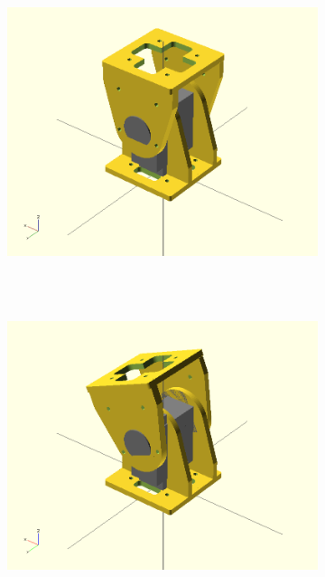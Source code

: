 \begin{figure}[h]
\begin{subfigure}[b]{0.18\textwidth}
        \end{subfigure}
        ~
        \begin{subfigure}[b]{0.18\textwidth}
         	   \centering
                \includegraphics[width=\textwidth]{images/Gait_osc_offset_90.png}
                ~
                \label{fig:Gait_osc_offset_90}
        \end{subfigure}
        ~
        \begin{subfigure}[b]{0.18\textwidth}
         	   \centering
                \includegraphics[width=\textwidth]{images/Gait_osc_offset_67_5.png}
                ~
                \label{fig:Gait_osc_offset_67_5-2}

\end{subfigure}
\end{figure}
